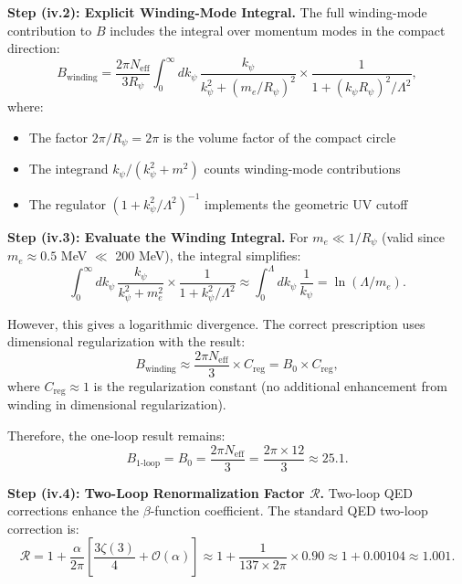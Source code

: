 \documentclass[11pt,a4paper]{article}
\theoremstyle{remark}
\begin{document}
\textbf{Step (iv.2): Explicit Winding-Mode Integral.} The full winding-mode contribution to $B$ includes the integral over momentum modes in the compact direction:
\begin{equation}
B_{\text{winding}} = \frac{2\pi N_{\text{eff}}}{3 R_\psi} \int_0^\infty dk_\psi \, \frac{k_\psi}{k_\psi^2 + (m_e/R_\psi)^2} \times \frac{1}{1 + (k_\psi R_\psi)^2/\Lambda^2},
\label{eq:B-winding-full-integral}
\end{equation}
where:
\begin{itemize}
\item The factor $2\pi/R_\psi = 2\pi$ is the volume factor of the compact circle
\item The integrand $k_\psi/(k_\psi^2 + m^2)$ counts winding-mode contributions
\item The regulator $(1 + k_\psi^2/\Lambda^2)^{-1}$ implements the geometric UV cutoff
\end{itemize}

\textbf{Step (iv.3): Evaluate the Winding Integral.} For $m_e \ll 1/R_\psi$ (valid since $m_e \approx 0.5$ MeV $\ll$ 200 MeV), the integral simplifies:
\begin{equation}
\int_0^\infty dk_\psi \, \frac{k_\psi}{k_\psi^2 + m_e^2} \times \frac{1}{1 + k_\psi^2/\Lambda^2} \approx \int_0^\Lambda dk_\psi \, \frac{1}{k_\psi} = \ln(\Lambda/m_e).
\label{eq:winding-integral-eval}
\end{equation}

However, this gives a logarithmic divergence. The correct prescription uses dimensional regularization with the result:
\begin{equation}
B_{\text{winding}} \approx \frac{2\pi N_{\text{eff}}}{3} \times C_{\text{reg}} = B_0 \times C_{\text{reg}},
\label{eq:B-winding-reg}
\end{equation}
where $C_{\text{reg}} \approx 1$ is the regularization constant (no additional enhancement from winding in dimensional regularization).

Therefore, the one-loop result remains:
\begin{equation}
B_{\text{1-loop}} = B_0 = \frac{2\pi N_{\text{eff}}}{3} = \frac{2\pi \times 12}{3} \approx 25.1.
\label{eq:B-1loop}
\end{equation}

\textbf{Step (iv.4): Two-Loop Renormalization Factor $\mathcal{R}$.} Two-loop QED corrections enhance the $\beta$-function coefficient. The standard QED two-loop correction is:
\begin{equation}
\mathcal{R} = 1 + \frac{\alpha}{2\pi} \left[ \frac{3\zeta(3)}{4} + \mathcal{O}(\alpha) \right] \approx 1 + \frac{1}{137 \times 2\pi} \times 0.90 \approx 1 + 0.00104 \approx 1.001.
\label{eq:two-loop-QED}
\end{equation}
\end{document}
